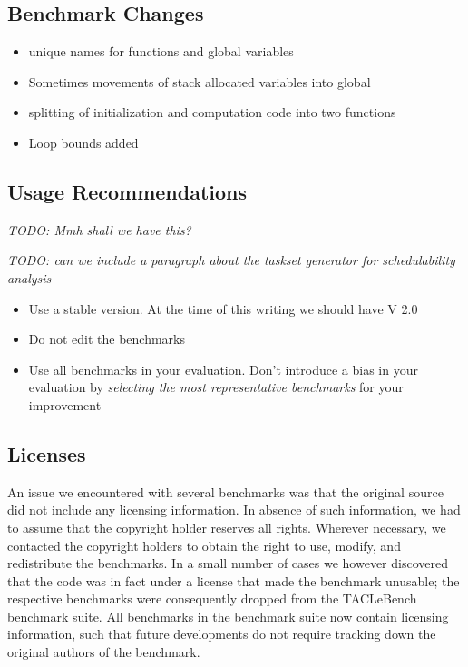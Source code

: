 \documentclass[a4paper,UKenglish]{oasics}
\newcommand{\todo}[1]{{\emph{TODO: #1}}}
\begin{document}
\subsection{Benchmark Changes}



\begin{itemize}
\item unique names for functions and global variables
\item Sometimes movements of stack allocated variables into global
\item splitting of initialization and computation code into two functions
\item Loop bounds added
\end{itemize}


\subsection{Usage Recommendations}

\todo{Mmh shall we have this?}

\todo{can we include a paragraph about the taskset generator for schedulability analysis}

\begin{itemize}
\item Use a stable version. At the time of this writing we should have V 2.0
\item Do not edit the benchmarks
\item Use all benchmarks in your evaluation. Don't introduce a bias in your evaluation by
\emph{selecting the most representative benchmarks} for your improvement
\end{itemize}

\subsection{Licenses}

An issue we encountered with several benchmarks was that the original
source did not include any licensing information. In absence of such
information, we had to assume that the copyright holder reserves all
rights. Wherever necessary, we contacted the copyright holders to
obtain the right to use, modify, and redistribute the benchmarks. In a
small number of cases we however discovered that the code was in fact
under a license that made the benchmark unusable; the respective
benchmarks were consequently dropped from the TACLeBench benchmark
suite. All benchmarks in the benchmark suite now contain licensing
information, such that future developments do not require tracking
down the original authors of the benchmark.
\end{document}
